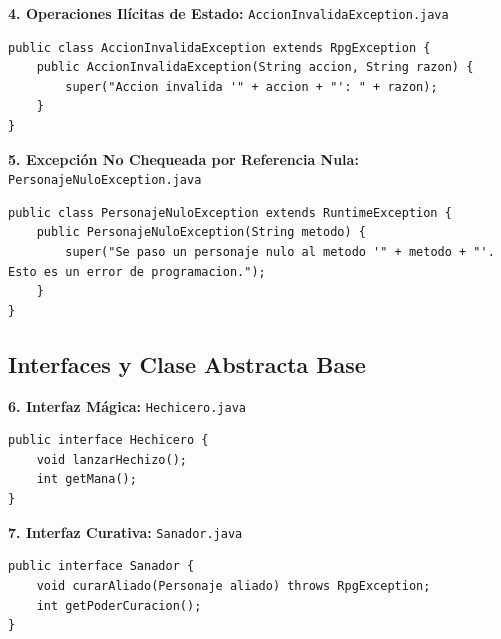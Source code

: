 \documentclass[11pt,letterpaper]{article}
\begin{document}
\textbf{4. Operaciones Ilícitas de Estado:} \texttt{AccionInvalidaException.java}
\begin{lstlisting}[style=JavaStyle]
public class AccionInvalidaException extends RpgException {
    public AccionInvalidaException(String accion, String razon) {
        super("Accion invalida '" + accion + "': " + razon);
    }
}
\end{lstlisting}

\textbf{5. Excepción No Chequeada por Referencia Nula:} \texttt{PersonajeNuloException.java}
\begin{lstlisting}[style=JavaStyle]
public class PersonajeNuloException extends RuntimeException {
    public PersonajeNuloException(String metodo) {
        super("Se paso un personaje nulo al metodo '" + metodo + "'. Esto es un error de programacion.");
    }
}
\end{lstlisting}

\subsection{Interfaces y Clase Abstracta Base}

\textbf{6. Interfaz Mágica:} \texttt{Hechicero.java}
\begin{lstlisting}[style=JavaStyle]
public interface Hechicero {
    void lanzarHechizo();
    int getMana();
}
\end{lstlisting}

\textbf{7. Interfaz Curativa:} \texttt{Sanador.java}
\begin{lstlisting}[style=JavaStyle]
public interface Sanador {
    void curarAliado(Personaje aliado) throws RpgException;
    int getPoderCuracion();
}
\end{lstlisting}
\end{document}
